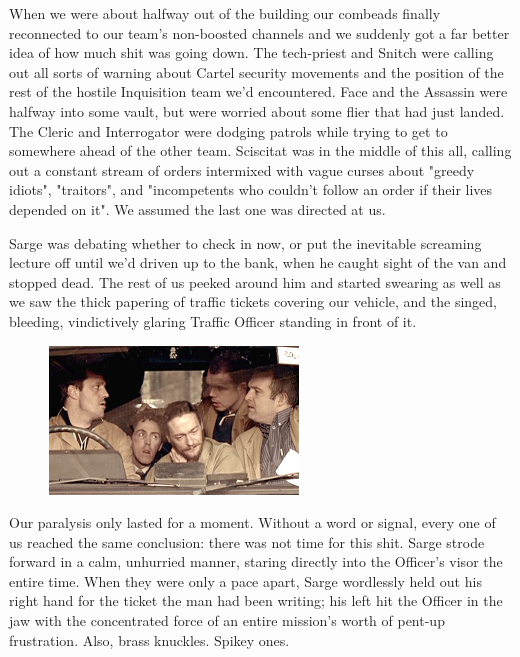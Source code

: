 When we were about halfway out of the building our combeads finally reconnected to our team's non-boosted channels and we suddenly got a far better idea of how much shit was going down. 
The tech-priest and Snitch were calling out all sorts of warning about Cartel security movements and the position of the rest of the hostile Inquisition team we'd encountered. 
Face and the Assassin were halfway into some vault, but were worried about some flier that had just landed. 
The Cleric and Interrogator were dodging patrols while trying to get to somewhere ahead of the other team. 
Sciscitat was in the middle of this all, calling out a constant stream of orders intermixed with vague curses about "greedy idiots", "traitors", and "incompetents who couldn't follow an order if their lives depended on it". 
We assumed the last one was directed at us. 


Sarge was debating whether to check in now, or put the inevitable screaming lecture off until we'd driven up to the bank, when he caught sight of the van and stopped dead. 
The rest of us peeked around him and started swearing as well as we saw the thick papering of traffic tickets covering our vehicle, and the singed, bleeding, vindictively glaring Traffic Officer standing in front of it.

\begin{figure}
	\begin{center}
		\includegraphics[width=\figwidth]{pics/18/22.png}
	\end{center}
\end{figure}
Our paralysis only lasted for a moment. 
Without a word or signal, every one of us reached the same conclusion: 
there was not time for this shit. 
Sarge strode forward in a calm, unhurried manner, staring directly into the Officer's visor the entire time. 
When they were only a pace apart, Sarge wordlessly held out his right hand for the ticket the man had been writing; 
his left hit the Officer in the jaw with the concentrated force of an entire mission's worth of pent-up frustration. 
Also, brass knuckles. 
Spikey ones.

